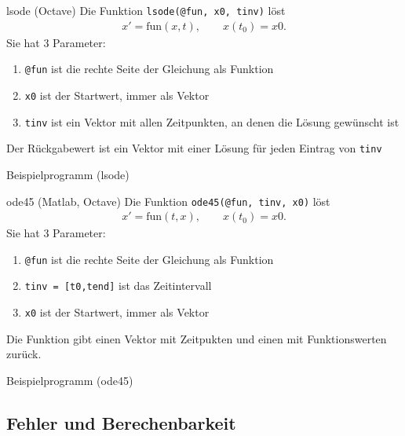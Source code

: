 \begin{frame}{lsode (Octave)}
  Die Funktion \lstinline!lsode(@fun, x0, tinv)! löst
  \begin{gather*}
    x' = \text{fun}(x,t), \qquad x(t_0) = x0.
  \end{gather*}
  Sie hat 3 Parameter:
  \begin{enumerate}
  \item \lstinline!@fun! ist die rechte Seite der Gleichung als Funktion
  \item \lstinline!x0! ist der Startwert, immer als Vektor
  \item \lstinline!tinv! ist ein Vektor mit allen Zeitpunkten, an denen
    die Lösung gewünscht ist
  \end{enumerate}
  Der Rückgabewert ist ein Vektor mit einer Lösung für jeden Eintrag
  von \lstinline!tinv!
\end{frame}

\begin{frame}{Beispielprogramm (lsode)}
  

  
\end{frame}

\begin{frame}{ode45 (Matlab, Octave)}
  Die Funktion \lstinline!ode45(@fun, tinv, x0)! löst
  \begin{gather*}
    x' = \text{fun}(t,x), \qquad x(t_0) = x0.
  \end{gather*}
  Sie hat 3 Parameter:
  \begin{enumerate}
  \item \lstinline!@fun! ist die rechte Seite der Gleichung als Funktion
  \item \lstinline!tinv = [t0,tend]! ist das Zeitintervall
  \item \lstinline!x0! ist der Startwert, immer als Vektor
  \end{enumerate}
  Die Funktion gibt einen Vektor mit Zeitpukten und einen mit
  Funktionswerten zurück.
\end{frame}

\begin{frame}{Beispielprogramm (ode45)}
  

  
\end{frame}



\subsection{Fehler und Berechenbarkeit}
\frame{\subtoc}

